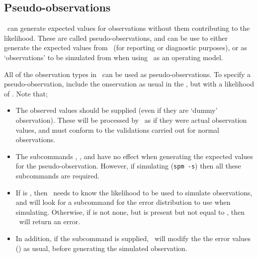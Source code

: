 \subsection{Pseudo-observations}

\SPM\ can generate expected values for observations without them contributing to the likelihood. These are called pseudo-observations, and can be use to either generate the expected values from \SPM\ (for reporting or diagnostic purposes), or as `observations' to be simulated from when using \SPM\ as an operating model.

All of the observation types in \SPM\ can be used as pseudo-observations. To specify a pseudo-observation, include the onservation as usual in the \config, but with a likelihood of . Note that;

\begin{itemize}
  \item The observed values should be supplied (even if they are `dummy' observation). These will be processed by \SPM\ as if they were actual observation values, and must conform to the validations carried out for normal observations. 
  \item The subcommands , ,  and  have no effect when generating the expected values for the pseudo-observation. However, if simulating (\texttt{spm -s}) then all these subcommands are required. 
  \item If  is , then \SPM\ needs to know the likelihood to be used to simulate observations, and will look for a subcommand  for the error distribution to use when simulating. Otherwise, if  is not none, but  is present but not equal to , then \SPM\ will return an error.
  \item In addition, if the subcommand  is supplied, \SPM\ will modify the the error values () as usual, before generating the simulated observation.
\end{itemize}
